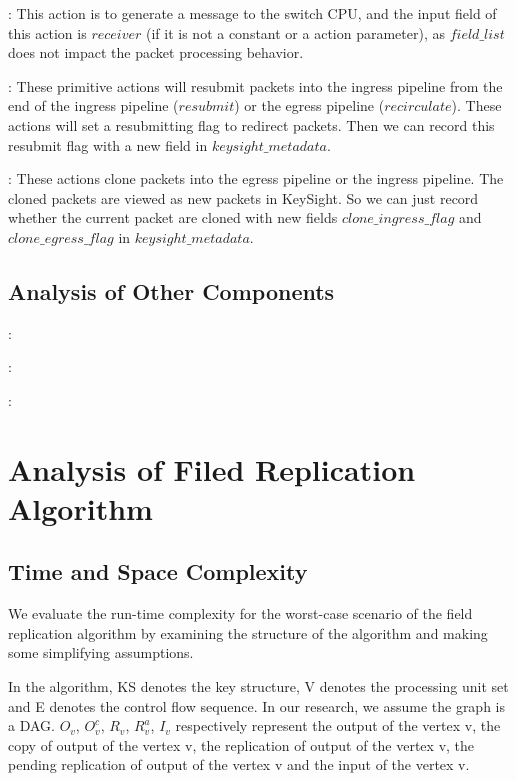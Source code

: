 : This action is to generate a message to the switch CPU, and the input field of this action is $receiver$ (if it is not a constant or a action parameter), as $field\_list$ does not impact the packet processing behavior.

 : These primitive actions will resubmit packets into the ingress pipeline from the end of the ingress pipeline ($resubmit$) or the egress pipeline ($recirculate$). These actions will set a resubmitting flag to redirect packets. Then we can record this resubmit flag with a new field in $keysight\_metadata$.

 : These actions clone packets into the egress pipeline or the ingress pipeline. The cloned packets are viewed as new packets in KeySight. So we can just record whether the current packet are cloned with new fields $clone\_ingress\_flag$ and $clone\_egress\_flag$ in $keysight\_metadata$.

\subsection{Analysis of Other Components}


: 

: 

: 

\section{Analysis of Filed Replication Algorithm}





\subsection{Time and Space Complexity}
We evaluate the run-time complexity for the worst-case scenario of the field replication algorithm by examining the structure of the algorithm and making some simplifying assumptions.

In the algorithm, KS denotes the key structure, V denotes the processing unit set and E denotes the control flow sequence. In our research, we assume the graph is a DAG. $O_{v}$,  $O^{c}_{v}$, $R_{v}$, $R^{a}_{v}$, $I_{v}$ respectively represent the output of the vertex v, the copy of output of the vertex v, the replication of output of the vertex v, the pending replication of output of the vertex v and the input of the vertex v.

